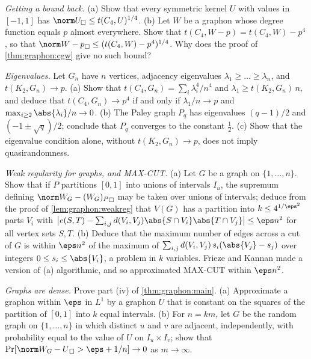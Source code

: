 \begin{refsection}
\begin{exercises}
\item \consolidation\hard\label{ex:graphon:quantitative} \emph{Getting a bound back.} (a) Show that every symmetric kernel $U$ with values in $[-1,1]$ has $\graphoncut{U}\le t(C_4,U)^{1/4}$. (b) Let $W$ be a graphon whose degree function equals $p$ almost everywhere. Show that $t(C_4,W-p)=t(C_4,W)-p^4$, so that $\graphoncut{W-p}\le(t(C_4,W)-p^4)^{1/4}$. Why does the proof of \cref{thm:graphon:cgw} give no such bound? 

\item \consolidation\label{ex:graphon:eig} \emph{Eigenvalues.} Let $G_n$ have $n$ vertices, adjacency eigenvalues $\lambda_1\ge\dots\ge\lambda_n$, and $t(K_2,G_n)\to p$. (a) Show that $t(C_4,G_n)=\sum_i\lambda_i^4/n^4$ and $\lambda_1\ge t(K_2,G_n)\,n$, and deduce that $t(C_4,G_n)\to p^4$ if and only if $\lambda_1/n\to p$ and $\max_{i\ge2}\abs{\lambda_i}/n\to0$. (b) The Paley graph $P_q$ has eigenvalues $(q-1)/2$ and $(-1\pm\sqrt q)/2$; conclude that $P_q$ converges to the constant $\tfrac12$. (c) Show that the eigenvalue condition alone, without $t(K_2,G_n)\to p$, does not imply quasirandomness.

\item \consolidation\label{ex:graphon:maxcut} \emph{Weak regularity for graphs, and MAX-CUT.} (a) Let $G$ be a graph on $\{1,\dots,n\}$. Show that if $P$ partitions $[0,1]$ into unions of intervals $I_u$, the supremum defining $\graphoncut{W_G-(W_G)_P}$ may be taken over unions of intervals; deduce from the proof of \cref{lem:graphon:weakreg} that $V(G)$ has a partition into $k\le4^{1/\eps^2}$ parts $V_i$ with $\bigl\lvert e(S,T)-\sum_{i,j}d(V_i,V_j)\abs{S\cap V_i}\abs{T\cap V_j}\bigr\rvert\le\eps n^2$ for all vertex sets $S,T$. (b) Deduce that the maximum number of edges across a cut of $G$ is within $\eps n^2$ of the maximum of $\sum_{i,j}d(V_i,V_j)\,s_i(\abs{V_j}-s_j)$ over integers $0\le s_i\le\abs{V_i}$, a problem in $k$ variables. Frieze and Kannan made a version of (a) algorithmic, and so approximated MAX-CUT within $\eps n^2$.

\item \consolidation\hard\label{ex:graphon:dense} \emph{Graphs are dense.} Prove part (iv) of \cref{thm:graphon:main}. (a) Approximate a graphon within $\eps$ in $L^1$ by a graphon $U$ that is constant on the squares of the partition of $[0,1]$ into $k$ equal intervals. (b) For $n=km$, let $G$ be the random graph on $\{1,\dots,n\}$ in which distinct $u$ and $v$ are adjacent, independently, with probability equal to the value of $U$ on $I_u\times I_v$; show that $\Pr[\graphoncut{W_G-U}>\eps+1/n]\to0$ as $m\to\infty$. 


\end{exercises}
\end{refsection}
